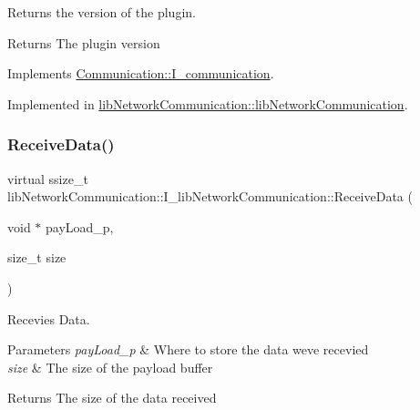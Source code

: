 Returns the version of the plugin. 

\begin{DoxyReturn}{Returns}
The plugin version 
\end{DoxyReturn}


Implements \mbox{\hyperlink{classCommunication_1_1I__communication_a3ff1f75536d5a7394ef736353bd29e53}{Communication\+::\+I\+\_\+communication}}.



Implemented in \mbox{\hyperlink{classlibNetworkCommunication_1_1libNetworkCommunication_a78dce6f61316f1f2068c0f03c7cc4b32}{lib\+Network\+Communication\+::lib\+Network\+Communication}}.

\mbox{\label{classlibNetworkCommunication_1_1I__libNetworkCommunication_ad8c03e24047f105a93549443c2ec2c92}} 
\subsubsection{\texorpdfstring{ReceiveData()}{ReceiveData()}}
{\footnotesize\ttfamily virtual ssize\+\_\+t lib\+Network\+Communication\+::\+I\+\_\+lib\+Network\+Communication\+::\+Receive\+Data (\begin{DoxyParamCaption}\item[{void $\ast$}]{pay\+Load\+\_\+p,  }\item[{size\+\_\+t}]{size }\end{DoxyParamCaption})\hspace{0.3cm}{\ttfamily [pure virtual]}}



Recevies Data. 


\begin{DoxyParams}{Parameters}
{\em pay\+Load\+\_\+p} & Where to store the data we\textquotesingle{}ve recevied \\
\hline
{\em size} & The size of the payload buffer \\
\hline
\end{DoxyParams}
\begin{DoxyReturn}{Returns}
The size of the data received 
\end{DoxyReturn}


